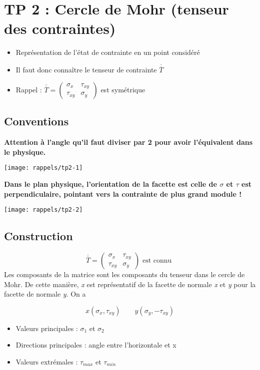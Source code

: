
\section*{TP 2 : Cercle de Mohr (tenseur des contraintes)}
\begin{itemize}
	\item Représentation de l'état de contrainte en un point considéré
	\item Il faut donc connaître le tenseur de contrainte $\overline{\overline{T}}$
	\item Rappel : $\overline{\overline{T}} = 
	      \left(	
	      \begin{array}{cc}
	      	\sigma _x  & \tau _{xy} \\ 
	      	\tau _{xy} & \sigma _y  
	      \end{array}
	      \right) $ est symétrique
\end{itemize}

\subsection*{Conventions}
\noindent \textbf{Attention à l'angle qu'il faut diviser par 2 pour avoir l'équivalent dans le physique.}
\begin{center}
	\texttt{[image: rappels/tp2-1]}
\end{center}

\textbf{Dans le plan physique, l'orientation de la facette est celle de $\sigma$ et $\tau$ est perpendiculaire, pointant vers la contrainte de plus grand module !}
\begin{center}
	\texttt{[image: rappels/tp2-2]}
\end{center}

\subsection*{Construction}
\begin{equation}
	\overline{\overline{T}} = 
	\left(	
	\begin{array}{cc}
		\sigma _x  & \tau _{xy} \\ 
		\tau _{xy} & \sigma _y  
	\end{array}
	\right) \mbox{ est connu }
\end{equation}
Les composants de la matrice sont les composants du tenseur dans le cercle de Mohr. De cette manière, \textit{x} est représentatif de la facette de normale \textit{x} et \textit{y} pour la facette de normale \textit{y}. On a

\begin{equation}
	x(\sigma _x , \tau _{xy}) \qquad y(\sigma _y, - \tau _{xy})
\end{equation}

\begin{itemize}
	\item Valeurs principales : $\sigma _1$ et $\sigma _2$
	\item Directions principales : angle entre l'horizontale et x
	\item Valeurs extrémales : $\tau _{max}$ et $\tau _{min}$
\end{itemize}
